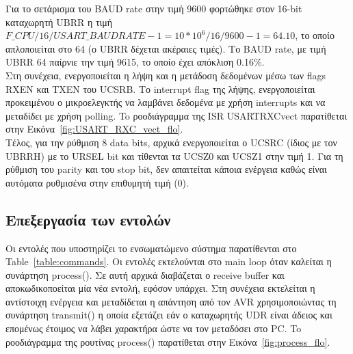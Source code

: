 \documentclass[a4paper,12pt]{article}
\begin{document}
Για το σετάρισμα του BAUD rate στην τιμή 9600 φορτώθηκε στον 16-bit καταχωρητή UBRR η τιμή $F\_CPU/16/USART\_BAUDRATE - 1  = 10 * 10^6 / 16 / 9600 - 1 = 64.10$, το οποίο απλοποιείται στο 64 (ο UBRR δέχεται ακέραιες τιμές). Το BAUD rate, με τιμή UBRR 64 παίρνιε την τιμή 9615, το οποίο έχει απόκλιση 0.16\%. \\

Στη συνέχεια, ενεργοποιείται η λήψη και η μετάδοση δεδομένων μέσω των flags RXEN και TXEN του UCSRB. Το interrupt flag της λήψης, ενεργοποιείται προκειμένου ο μικροελεγκτής να λαμβάνει δεδομένα με χρήση interrupts και να μεταδίδει με χρήση polling. To ροοδιάγραμμα της ISR USART\textunderscore RXC\textunderscore vect παρατίθεται στην Εικόνα~\ref{fig:USART_RXC_vect_flo}.\\

Τέλος, για την ρύθμιση 8 data bits, αρχικά ενεργοποιείται ο UCSRC (ίδιος με τον UBRRH) με το URSEL bit και τίθενται τα UCSZ0 και UCSZ1 στην τιμή 1. Για τη ρύθμιση του parity και του stop bit, δεν απαιτείται κάποια ενέργεια καθώς είναι αυτόματα ρυθμισένα στην επιθυμητή τιμή (0).\\




\subsection{Επεξεργασία των εντολών}
Οι εντολές που υποστηρίζει το ενσωματώμενο σύστημα παρατίθενται στο Table~\ref{table:commands}. Οι εντολές εκτελούνται στο main loop όταν καλείται η συνάρτηση process(). Σε αυτή αρχικά διαβάζεται ο receive buffer και αποκωδικοποείται μία νέα εντολή, εφόσον υπάρχει. Στη συνέχεια εκτελείται η αντίστοιχη ενέργεια και μεταδίδεται η απάντηση από τον AVR χρησιμοποιώντας τη συνάρτηση transmit() η οποία εξετάζει εάν ο καταχωρητής UDR είναι άδειος και επομένως έτοιμος να λάβει χαρακτήρα ώστε να τον μεταδόσει στο PC. To ροοδιάγραμμα της ρουτίνας process() παρατίθεται στην Εικόνα~\ref{fig:process_flo}.\\
\end{document}
